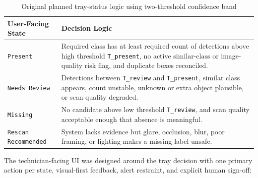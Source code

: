 \documentclass[10pt,a4paper]{article}
\begin{document}
\begin{table}[H]
\centering
\caption{Original planned tray-status logic using two-threshold confidence band}
\label{tab:original-planned-tray-status-logic}
\small\renewcommand{\arraystretch}{1.2}\setlength{\tabcolsep}{4pt}
\begin{tabularx}{\textwidth}{|>{\raggedright\arraybackslash}X|>{\raggedright\arraybackslash}X|}
\hline
User-Facing State & Decision Logic \\
\hline
\texttt{Present} & Required class has at least required count of detections above high threshold \texttt{T\_present}, no active similar-class or image-quality risk flag, and duplicate boxes reconciled. \\
\hline
\texttt{Needs Review} & Detections between \texttt{T\_review} and \texttt{T\_present}, similar class appears, count unstable, unknown or extra object plausible, or scan quality degraded. \\
\hline
\texttt{Missing} & No candidate above low threshold \texttt{T\_review}, and scan quality acceptable enough that absence is meaningful. \\
\hline
\texttt{Rescan Recommended} & System lacks evidence but glare, occlusion, blur, poor framing, or lighting makes a missing label unsafe. \\
\hline
\end{tabularx}
\end{table}

The technician-facing UI was designed around the tray decision with one
primary action per state, visual-first feedback, alert restraint, and explicit
human sign-off:
\end{document}
